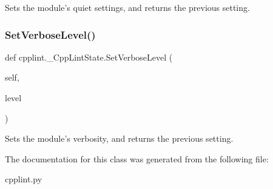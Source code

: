 \begin{DoxyVerb}Sets the module's quiet settings, and returns the previous setting.\end{DoxyVerb}
 \mbox{\label{classcpplint_1_1__CppLintState_ad4f97c907cc79e8d60237d0327830588}} 
\subsubsection{\texorpdfstring{Set\+Verbose\+Level()}{SetVerboseLevel()}}
{\footnotesize\ttfamily def cpplint.\+\_\+\+Cpp\+Lint\+State.\+Set\+Verbose\+Level (\begin{DoxyParamCaption}\item[{}]{self,  }\item[{}]{level }\end{DoxyParamCaption})}

\begin{DoxyVerb}Sets the module's verbosity, and returns the previous setting.\end{DoxyVerb}
 

The documentation for this class was generated from the following file\+:\begin{DoxyCompactItemize}
\item 
cpplint.\+py\end{DoxyCompactItemize}
